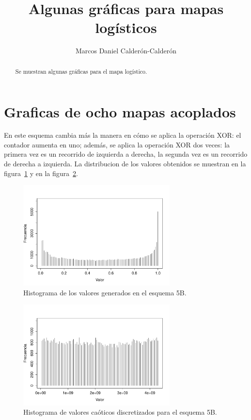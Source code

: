 \documentclass[preprint]{elsarticle}
\begin{document}
\begin{frontmatter}

\title{Algunas gráficas para mapas logísticos}


\author[md]{Marcos Daniel Calderón-Calderón}



\address[md]{Center for Research in Mathematics (CIMAT), Guanajuato, México.}


\begin{abstract}
Se muestran algunas gráficas para el mapa logístico.
\end{abstract}



\end{frontmatter}



 
   
 
 






\section{Graficas de ocho mapas acoplados}
\label{ac}

En este esquema cambia más la manera en cómo se aplica la operación XOR: el contador aumenta en uno; además, se aplica la operación XOR dos veces: la primera vez es un recorrido de izquierda a derecha, la segunda vez es un recorrido de derecha a izquierda. La distribucion de los valores obtenidos se muestran en la figura~\ref{fbl} y en la figura~\ref{fbd}.


\begin{figure}[H]  
\centering
\includegraphics[width=8cm]{fbl2.pdf}
\caption{Histograma de los valores generados en el esquema 5B.}
\label{fbl}
\end{figure}


\begin{figure}[H]
\centering
\includegraphics[width=8cm]{fbd2.pdf}
\caption{Histograma de valores caóticos discretizados para el esquema 5B.}
\label{fbd}
\end{figure}
\end{document}
